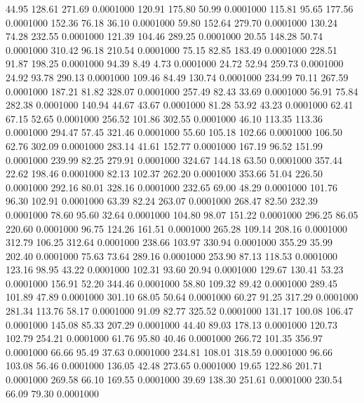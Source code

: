   44.95  128.61  271.69   0.0001000
 120.91  175.80   50.99   0.0001000
 115.81   95.65  177.56   0.0001000
 152.36   76.18   36.10   0.0001000
  59.80  152.64  279.70   0.0001000
 130.24   74.28  232.55   0.0001000
 121.39  104.46  289.25   0.0001000
  20.55  148.28   50.74   0.0001000
 310.42   96.18  210.54   0.0001000
  75.15   82.85  183.49   0.0001000
 228.51   91.87  198.25   0.0001000
  94.39    8.49    4.73   0.0001000
  24.72   52.94  259.73   0.0001000
  24.92   93.78  290.13   0.0001000
 109.46   84.49  130.74   0.0001000
 234.99   70.11  267.59   0.0001000
 187.21   81.82  328.07   0.0001000
 257.49   82.43   33.69   0.0001000
  56.91   75.84  282.38   0.0001000
 140.94   44.67   43.67   0.0001000
  81.28   53.92   43.23   0.0001000
  62.41   67.15   52.65   0.0001000
 256.52  101.86  302.55   0.0001000
  46.10  113.35  113.36   0.0001000
 294.47   57.45  321.46   0.0001000
  55.60  105.18  102.66   0.0001000
 106.50   62.76  302.09   0.0001000
 283.14   41.61  152.77   0.0001000
 167.19   96.52  151.99   0.0001000
 239.99   82.25  279.91   0.0001000
 324.67  144.18   63.50   0.0001000
 357.44   22.62  198.46   0.0001000
  82.13  102.37  262.20   0.0001000
 353.66   51.04  226.50   0.0001000
 292.16   80.01  328.16   0.0001000
 232.65   69.00   48.29   0.0001000
 101.76   96.30  102.91   0.0001000
  63.39   82.24  263.07   0.0001000
 268.47   82.50  232.39   0.0001000
  78.60   95.60   32.64   0.0001000
 104.80   98.07  151.22   0.0001000
 296.25   86.05  220.60   0.0001000
  96.75  124.26  161.51   0.0001000
 265.28  109.14  208.16   0.0001000
 312.79  106.25  312.64   0.0001000
 238.66  103.97  330.94   0.0001000
 355.29   35.99  202.40   0.0001000
  75.63   73.64  289.16   0.0001000
 253.90   87.13  118.53   0.0001000
 123.16   98.95   43.22   0.0001000
 102.31   93.60   20.94   0.0001000
 129.67  130.41   53.23   0.0001000
 156.91   52.20  344.46   0.0001000
  58.80  109.32   89.42   0.0001000
 289.45  101.89   47.89   0.0001000
 301.10   68.05   50.64   0.0001000
  60.27   91.25  317.29   0.0001000
 281.34  113.76   58.17   0.0001000
  91.09   82.77  325.52   0.0001000
 131.17  100.08  106.47   0.0001000
 145.08   85.33  207.29   0.0001000
  44.40   89.03  178.13   0.0001000
 120.73  102.79  254.21   0.0001000
  61.76   95.80   40.46   0.0001000
 266.72  101.35  356.97   0.0001000
  66.66   95.49   37.63   0.0001000
 234.81  108.01  318.59   0.0001000
  96.66  103.08   56.46   0.0001000
 136.05   42.48  273.65   0.0001000
  19.65  122.86  201.71   0.0001000
 269.58   66.10  169.55   0.0001000
  39.69  138.30  251.61   0.0001000
 230.54   66.09   79.30   0.0001000
